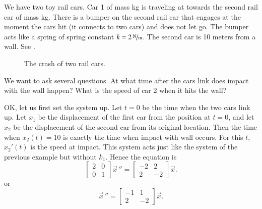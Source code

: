 \documentclass[12pt]{book}
\begin{document}
\begin{example} \label{sosa:railcarexample}
We have two toy rail
cars.  Car 1 of mass \unit[2]{kg} is traveling at 
towards the second
rail car of mass \unit[1]{kg}.  There is a bumper on the second rail car that
engages at the moment the cars hit (it connects to two cars)
and does not let go.
The bumper acts like a spring of spring constant $k=\unitfrac[2]{N}{m}$.
The second
car is 10 meters from a wall.  See .

\begin{figure}[h!t]
\capstart
\begin{center}
\caption{The crash of two rail cars.\label{sosa:railcarscrashfig}}
\end{center}
\end{figure}

We want to ask several questions.  At what time after the cars link does
impact with the wall happen?  What is the speed of car 2 when it hits the
wall?

OK, let us first set the system up.  Let $t=0$ be the time
when the two cars link up.  Let $x_1$ be the displacement of the first car
from the position at $t=0$, and let $x_2$ be the
displacement of the second car from its original location.  Then the
time when $x_2(t) = 10$ is exactly the time when impact with wall occurs.
For this $t$, $x_2'(t)$ is the speed at impact.  This system acts just like the
system of the previous example but without $k_1$.  Hence the equation is
\begin{equation*}
\begin{bmatrix}
2 & 0 \\
0 & 1
\end{bmatrix}
{\vec{x}\,}'' =
\begin{bmatrix}
-2 & 2 \\
2 & -2
\end{bmatrix}
\vec{x} .
\end{equation*}
or
\begin{equation*}
{\vec{x}\,}'' =
\begin{bmatrix}
-1 & 1 \\
2 & -2
\end{bmatrix}
\vec{x} .
\end{equation*}


\end{example}
\end{document}
